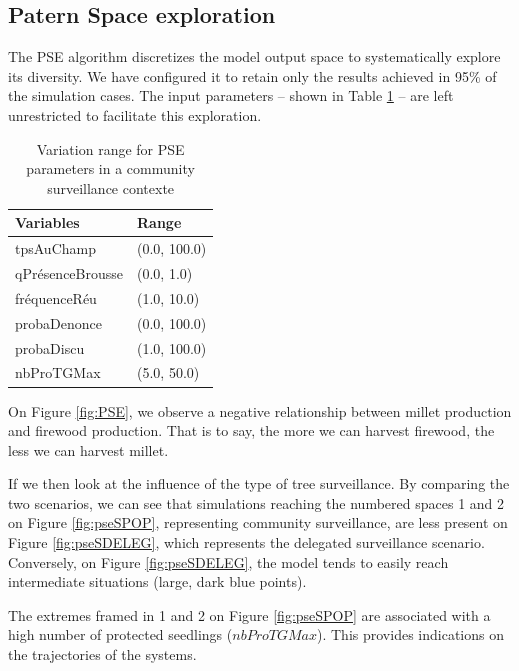 \documentclass{article}
\begin{document}
    \subsection{Patern Space exploration}

    The PSE algorithm discretizes the model output space to systematically explore its diversity. We have configured it to retain only the results achieved in 95\% of the simulation cases. The input parameters -- shown in Table \ref{tab:PSEparamsPop} -- are left unrestricted to facilitate this exploration.
    
    \begin{table}
        \centering\begingroup\fontsize{10}{12}\selectfont
            \begin{tabular}[]{ll}
                    \toprule
                    Variables & Range\\
                    \hline
                    \addlinespace
                    tpsAuChamp & (0.0, 100.0)\\
                    qPrésenceBrousse & (0.0, 1.0)\\
                    fréquenceRéu & (1.0, 10.0)\\
                    probaDenonce & (0.0, 100.0)\\
                    probaDiscu & (1.0, 100.0)\\
                    nbProTGMax & (5.0, 50.0)\\
                    \bottomrule
            \end{tabular}
            \caption{Variation range for PSE parameters in a community surveillance contexte}
            \label{tab:PSEparamsPop}
        \endgroup{}
    \end{table}

    On Figure \ref{fig:PSE}, we observe a negative relationship between millet production and firewood production. That is to say, the more we can harvest firewood, the less we can harvest millet.

    If we then look at the influence of the type of tree surveillance. By comparing the two scenarios, we can see that simulations reaching the numbered spaces 1 and 2 on Figure \ref{fig:pseSPOP}, representing community surveillance, are less present on Figure \ref{fig:pseSDELEG}, which represents the delegated surveillance scenario. Conversely, on Figure \ref{fig:pseSDELEG}, the model tends to easily reach intermediate situations (large, dark blue points).

    The extremes framed in 1 and 2 on Figure \ref{fig:pseSPOP} are associated with a high number of protected seedlings ($nbProTGMax$). This provides indications on the trajectories of the systems.
\end{document}
